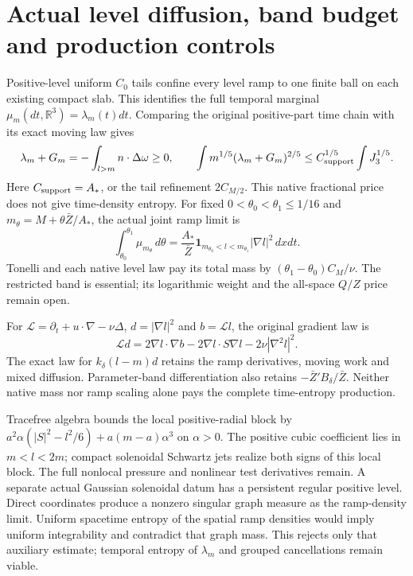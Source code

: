 \documentclass[11pt]{article}
\begin{document}
\section{Actual level diffusion, band budget and production controls}
Positive-level uniform $C_0$ tails confine every level ramp to one finite
ball on each existing compact slab. This identifies the full temporal
marginal $\mu_m(dt,\mathbb R^3)=\lambda_m(t)dt$. Comparing the original
positive-part time chain with its exact moving law gives
\[
 \lambda_m+G_m=-\int_{l>m}n\cdot\Delta\omega\ge0,
 \qquad
 \int m^{1/5}(\lambda_m+G_m)^{2/5}
       \le C_{\rm support}^{1/5}\int J_3^{1/5}.
\]
Here $C_{\rm support}=A_*$, or the tail refinement $2C_{M/2}$.
This native fractional price does not give time-density entropy.
For fixed $0<\theta_0<\theta_1\le1/16$ and
$m_\theta=M+\theta\bar Z/A_*$, the actual joint ramp limit is
\[
 \int_{\theta_0}^{\theta_1}\mu_{m_\theta}\,d\theta
  =\frac{A_*}{\bar Z}\mathbf1_{m_{\theta_0}<l<m_{\theta_1}}
                       |\nabla l|^2\,dxdt.
\]
Tonelli and each native level law pay its total mass by
$(\theta_1-\theta_0)C_M/\nu$. The restricted band is essential;
its logarithmic weight and the all-space $Q/Z$ price remain open.

For $\mathcal L=\partial_t+u\cdot\nabla-\nu\Delta$,
$d=|\nabla l|^2$ and $b=\mathcal Ll$, the original gradient law is
\[
 \mathcal Ld=2\nabla l\cdot\nabla b
       -2\nabla l\cdot S\nabla l-2\nu|\nabla^2l|^2.
\]
The exact law for $k_\delta(l-m)d$ retains the ramp derivatives,
moving work and mixed diffusion. Parameter-band differentiation also
retains $-\bar Z'B_\delta/\bar Z$. Neither native mass nor ramp scaling
alone pays the complete time-entropy production.

Tracefree algebra bounds the local positive-radial block by
$a^2\alpha(|S|^2-l^2/6)+a(m-a)\alpha^3$ on $\alpha>0$.
The positive cubic coefficient lies in $m<l<2m$; compact solenoidal
Schwartz jets realize both signs of this local block. The full nonlocal
pressure and nonlinear test derivatives remain.
A separate actual Gaussian solenoidal datum has a persistent regular
positive level. Direct coordinates produce a nonzero singular graph
measure as the ramp-density limit. Uniform spacetime entropy of the
spatial ramp densities would imply uniform integrability and contradict
that graph mass. This rejects only that auxiliary estimate; temporal
entropy of $\lambda_m$ and grouped cancellations remain viable.
\end{document}
